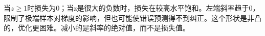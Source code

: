 当\(z\ge1\)时损失为0；当z是很大的负数时，损失在较高水平饱和。左端斜率趋于0，限制了极端样本对梯度的影响，但也可能使错误预测得不到纠正。这个形状是非凸的，优化更困难。减小的是斜率的绝对值，而不是损失值。
